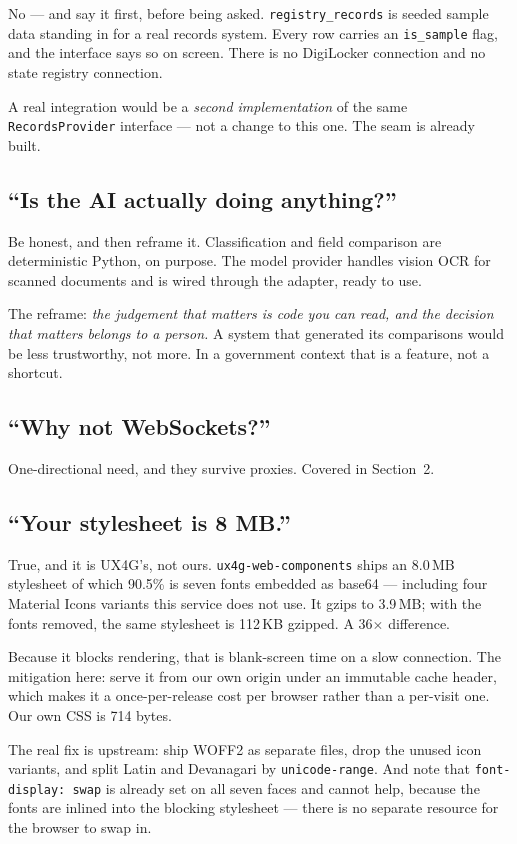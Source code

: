 \documentclass[11pt,a4paper]{article}
\begin{document}
No --- and say it first, before being asked. \texttt{registry\_records} is seeded
sample data standing in for a real records system. Every row carries an
\texttt{is\_sample} flag, and the interface says so on screen. There is no
DigiLocker connection and no state registry connection.

A real integration would be a \emph{second implementation} of the same
\texttt{RecordsProvider} interface --- not a change to this one. The seam is
already built.

\subsection*{``Is the AI actually doing anything?''}

Be honest, and then reframe it. Classification and field comparison are
deterministic Python, on purpose. The model provider handles vision OCR for
scanned documents and is wired through the adapter, ready to use.

The reframe: \emph{the judgement that matters is code you can read, and the
decision that matters belongs to a person.} A system that generated its
comparisons would be less trustworthy, not more. In a government context that is
a feature, not a shortcut.

\subsection*{``Why not WebSockets?''}

One-directional need, and they survive proxies. Covered in Section~2.

\subsection*{``Your stylesheet is 8 MB.''}

True, and it is UX4G's, not ours. \texttt{ux4g-web-components} ships an 8.0\,MB
stylesheet of which 90.5\% is seven fonts embedded as base64 --- including four
Material Icons variants this service does not use. It gzips to 3.9\,MB; with the
fonts removed, the same stylesheet is 112\,KB gzipped. A 36$\times$ difference.

Because it blocks rendering, that is blank-screen time on a slow connection. The
mitigation here: serve it from our own origin under an immutable cache header,
which makes it a once-per-release cost per browser rather than a per-visit one.
Our own CSS is 714 bytes.

The real fix is upstream: ship WOFF2 as separate files, drop the unused icon
variants, and split Latin and Devanagari by \texttt{unicode-range}. And note
that \texttt{font-display: swap} is already set on all seven faces and cannot
help, because the fonts are inlined into the blocking stylesheet --- there is no
separate resource for the browser to swap in.
\end{document}
